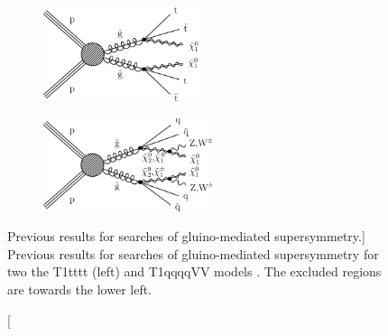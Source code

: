 \begin{figure}[hbp!]
\begin{subfigure}{0.45\textwidth}
\centering
\includegraphics[width=0.5\textwidth]{figs/CMS-SUS-16-033_Figure_001-a.pdf}  
\end{subfigure}
\begin{subfigure}{0.45\textwidth}
\centering
\includegraphics[width=0.55\textwidth]{figs/CMS-SUS-16-033_Figure_001-c.pdf}
\end{subfigure}
\caption
[Previous results for searches of gluino-mediated supersymmetry.]
{Previous results for searches of gluino-mediated supersymmetry for two the T1tttt (left) and T1qqqqVV models \cite{CMS-SUS-16-033}. The excluded regions are towards the lower left.}
\label{fig:oldlimits}
\end{figure} 
